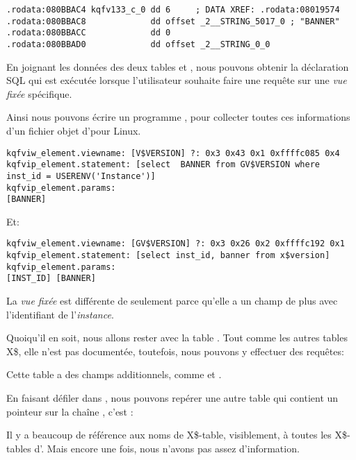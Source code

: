 \begin{lstlisting}[caption=kqf.o,style=customasmx86]
.rodata:080BBAC4 kqfv133_c_0 dd 6     ; DATA XREF: .rodata:08019574
.rodata:080BBAC8             dd offset _2__STRING_5017_0 ; "BANNER"
.rodata:080BBACC             dd 0
.rodata:080BBAD0             dd offset _2__STRING_0_0
\end{lstlisting}

En joignant les données des deux tables  et , nous pouvons
obtenir la déclaration SQL qui est exécutée lorsque l'utilisateur souhaite faire
une requête sur une \emph{vue fixée} spécifique.

Ainsi nous pouvons écrire un programme \oracletables, pour collecter toutes ces informations
d'un fichier objet d'\oracle pour Linux.

\begin{lstlisting}[caption=Résultat de \OracleTablesName]
kqfviw_element.viewname: [V$VERSION] ?: 0x3 0x43 0x1 0xffffc085 0x4
kqfvip_element.statement: [select  BANNER from GV$VERSION where inst_id = USERENV('Instance')]
kqfvip_element.params:
[BANNER] 
\end{lstlisting}

Et:

\begin{lstlisting}[caption=Résultat de \OracleTablesName]
kqfviw_element.viewname: [GV$VERSION] ?: 0x3 0x26 0x2 0xffffc192 0x1
kqfvip_element.statement: [select inst_id, banner from x$version]
kqfvip_element.params:
[INST_ID] [BANNER] 
\end{lstlisting}

La \emph{vue fixée}  est différente de  seulement
parce qu'elle a un champ de plus avec l'identifiant de l'\emph{instance}.

Quoiqu'il en soit, nous allons rester avec la table . Tout comme les
autres tables X\$, elle n'est pas documentée, toutefois, nous pouvons y effectuer
des requêtes:



Cette table a des champs additionnels, comme  et .

En faisant défiler  dans \IDA, nous pouvons repérer une autre table qui
contient un pointeur sur la chaîne , c'est :



Il y a beaucoup de référence aux noms de X\$-table, visiblement, à toutes les X\$-tables
d'.
Mais encore une fois, nous n'avons pas assez d'information.

